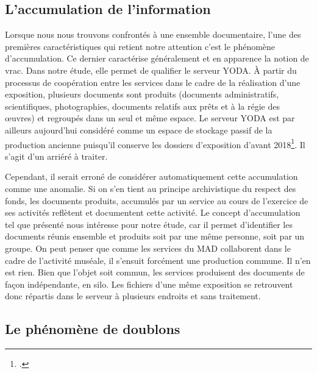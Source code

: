\subsection*{L’accumulation de l’information}

Lorsque nous nous trouvons confrontés à une ensemble documentaire, l’une des premières caractéristiques qui retient notre attention c’est le phénomène d’accumulation. Ce dernier caractérise généralement et en apparence la notion de vrac. Dans notre étude, elle permet de qualifier le serveur YODA.  À partir du processus de coopération entre les services dans le cadre de la réalisation d’une exposition, plusieurs documents sont produits (documents administratifs, scientifiques, photographies, documents relatifs aux prêts et à la régie des œuvres) et regroupés dans un seul et même espace. Le serveur YODA est par ailleurs aujourd’hui considéré comme un espace de stockage passif de la production ancienne puisqu’il conserve les dossiers d’exposition d’avant 2018\footcite[version 4, p.~4]{bomel-dion-note-cadrage}. Il s'agit d'un arriéré à traiter.

Cependant, il serait erroné de considérer automatiquement  cette accumulation comme une anomalie. Si on s’en tient au principe archivistique du respect des fonds, les documents produits, accumulés par un service au cours de l’exercice de ses activités reflètent et documentent cette activité. Le concept d’accumulation tel que présenté nous intéresse pour notre étude, car  il permet d’identifier les documents réunis ensemble et produits soit par une même personne, soit par un groupe. On peut penser que comme les services du MAD collaborent dans le cadre de l’activité muséale, il s'ensuit forcément une production commune. Il n’en est rien. Bien que l’objet soit commun, les services produisent des documents de façon indépendante, en silo. Les fichiers d’une même exposition se retrouvent donc répartis dans le serveur à plusieurs endroits et sans traitement.


\subsection*{Le phénomène de doublons}

